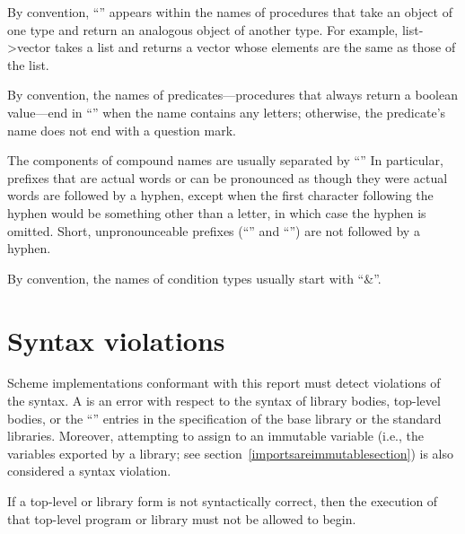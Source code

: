 By convention, ``\ide{->}'' appears within the names of procedures that
take an object of one type and return an analogous object of another type.
For example, {\cf list->vector} takes a list and returns a vector whose
elements are the same as those of the list.

By convention, the names of predicates---procedures that always return
a boolean value---end in ``'' when the name contains any
letters; otherwise, the predicate's name does not end with a question
mark.

The components of compound names are usually separated by ``\ide{-}''
In particular, prefixes that are actual words or can be pronounced as
though they were actual words are followed by a hyphen, except when
the first character following the hyphen would be something other than
a letter, in which case the hyphen is omitted.  Short,
unpronounceable prefixes (``'' and ``'') are not
followed by a hyphen.

By convention, the names of condition types usually start with
``{\cf\&}''.

\section{Syntax violations}

Scheme implementations conformant with this report must detect
violations of the syntax.  A  is an error
with respect to the syntax of library bodies, top-level bodies,
or the ``\exprtype'' entries in the
specification of the base library or the standard libraries.
Moreover, attempting to assign to an immutable variable (i.e., the
variables exported by a library; see
section~\ref{importsareimmutablesection}) is also
considered a syntax violation.

If a top-level or library form is not syntactically correct, then the
execution of that top-level program or library must not be allowed to begin.

